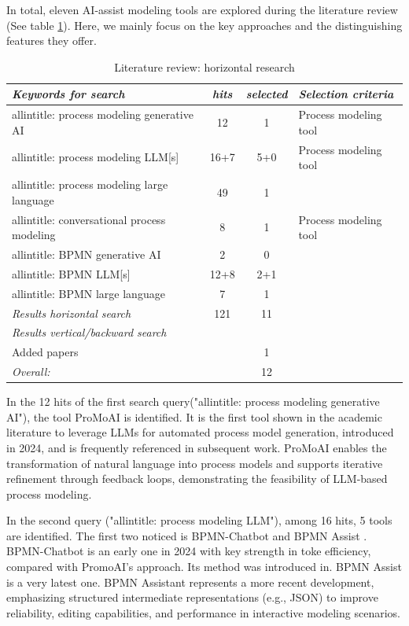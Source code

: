 In total, eleven AI-assist modeling tools are explored during the literature review (See table \ref{tab:lr}). Here, we mainly focus on the key approaches and the distinguishing features they offer. 

\begin{table}[htb!]
    \centering
    \caption{Literature review: horizontal research}
    \begin{tabular}{lccl}
        \textit{Keywords for search} & \textit{hits} & \textit{selected} & \textit{Selection criteria}\\
        \hline
        allintitle: process modeling generative AI & 12 & 1 & Process modeling tool\\
        allintitle: process modeling LLM[s] & 16+7 & 5+0 & Process modeling tool\\ 
        allintitle: process modeling large language & 49 & 1& \\   
        allintitle: conversational process modeling & 8 & 1 &Process modeling tool\\
        allintitle: BPMN generative AI & 2 & 0 & \\   
        allintitle: BPMN LLM[s]& 12+8 & 2+1& \\
        allintitle: BPMN large language& 7 & 1& \\
        \textit{Results horizontal search} & 121 & 11 & \\
        \textit{Results vertical/backward search} &  & & \\
        Added papers &  & 1& \\
        \textit{Overall:} &  & 12 & \\
        \hline
    \end{tabular}

    \label{tab:lr}
\end{table}
In the 12 hits of the first search query("allintitle: process modeling generative AI"), the tool ProMoAI \cite{kourani2024promoai} is identified. It is the first tool shown in the academic literature to leverage LLMs for automated process model generation, introduced in 2024, and is frequently referenced in subsequent work. ProMoAI enables the transformation of natural language into process models and supports iterative refinement through feedback loops, demonstrating the feasibility of LLM-based process modeling.

In the second query ("allintitle: process modeling LLM"), among 16 hits, 5 tools are identified. The first two noticed is BPMN-Chatbot  \cite{kopke2024introducing} and BPMN Assist    \cite{licardo2026bpmn}. BPMN-Chatbot is an early one in 2024 with key strength in toke efficiency\cite{kopke2024efficient}, compared with PromoAI's approach. Its method was introduced in. BPMN Assist    \cite{licardo2026bpmn} is a very latest one. BPMN Assistant \cite{licardo2026bpmn} represents a more recent development, emphasizing structured intermediate representations (e.g., JSON) to improve reliability, editing capabilities, and performance in interactive modeling scenarios.

